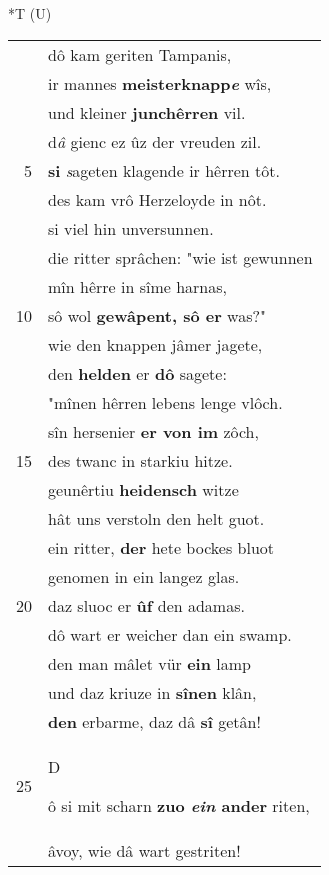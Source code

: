 \documentclass[8pt,a4paper,notitlepage]{article}
\begin{document}
\begin{table}[ht]
\begin{minipage}[t]{0.5\linewidth}
\end{minipage}
\hspace{0.5cm}
\begin{minipage}[t]{0.5\linewidth}
\small
\begin{center}*T (U)
\end{center}
\begin{tabular}{rl}
 & dô kam geriten Tampanis,\\ 
 & ir mannes \textbf{meisterknapp\textit{e}} wîs,\\ 
 & und kleiner \textbf{junchêrren} vil.\\ 
 & d\textit{â} gienc ez ûz der vreuden zil.\\ 
5 & \textbf{si} \textit{s}ageten klagende ir hêrren tôt.\\ 
 & des kam vrô Herzeloyde in nôt.\\ 
 & si viel hin unversunnen.\\ 
 & die ritter sprâchen: "wie ist gewunnen\\ 
 & mîn hêrre in sîme harnas,\\ 
10 & sô wol \textbf{gewâpent, sô er} was?"\\ 
 & wie den knappen jâmer jagete,\\ 
 & den \textbf{helden} er \textbf{dô} sagete:\\ 
 & "mînen hêrren lebens lenge vlôch.\\ 
 & sîn hersenier \textbf{er von im} zôch,\\ 
15 & des twanc in starkiu hitze.\\ 
 & geunêrtiu \textbf{heidensch} witze\\ 
 & hât uns verstoln den helt guot.\\ 
 & ein ritter, \textbf{der} hete bockes bluot\\ 
 & genomen in ein langez glas.\\ 
20 & daz sluoc er \textbf{ûf} den adamas.\\ 
 & dô wart er weicher dan ein swamp.\\ 
 & den man mâlet vür \textbf{ein} lamp\\ 
 & und daz kriuze in \textbf{sînen} klân,\\ 
 & \textbf{den} erbarme, daz dâ \textbf{sî} getân!\\ 
25 & \begin{large}D\end{large}ô si mit scharn \textbf{zuo \textit{ein} ander} riten,\\ 
 & âvoy, wie dâ wart gestriten!\\ 

\end{tabular}
\end{minipage}
\end{table}
\end{document}
